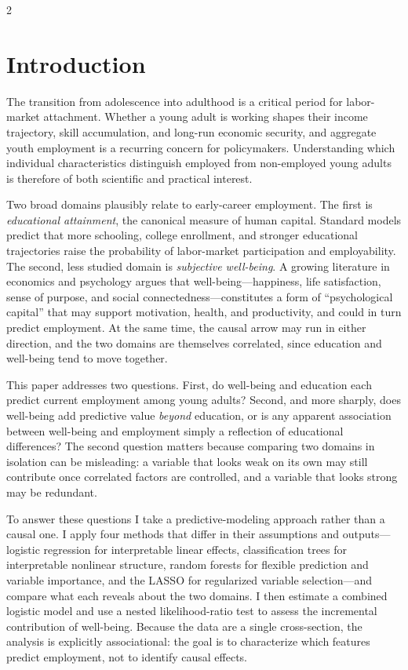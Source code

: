 \documentclass[
  11pt,
]{article}
\begin{document}
\begin{multicols}{2}

\section{Introduction}
The transition from adolescence into adulthood is a critical period for labor-market attachment. Whether a young adult is working shapes their income trajectory, skill accumulation, and long-run economic security, and aggregate youth employment is a recurring concern for policymakers. Understanding which individual characteristics distinguish employed from non-employed young adults is therefore of both scientific and practical interest.

Two broad domains plausibly relate to early-career employment. The first is \emph{educational attainment}, the canonical measure of human capital. Standard models predict that more schooling, college enrollment, and stronger educational trajectories raise the probability of labor-market participation and employability. The second, less studied domain is \emph{subjective well-being}. A growing literature in economics and psychology argues that well-being---happiness, life satisfaction, sense of purpose, and social connectedness---constitutes a form of ``psychological capital'' that may support motivation, health, and productivity, and could in turn predict employment. At the same time, the causal arrow may run in either direction, and the two domains are themselves correlated, since education and well-being tend to move together.

This paper addresses two questions. First, do well-being and education each predict current employment among young adults? Second, and more sharply, does well-being add predictive value \emph{beyond} education, or is any apparent association between well-being and employment simply a reflection of educational differences? The second question matters because comparing two domains in isolation can be misleading: a variable that looks weak on its own may still contribute once correlated factors are controlled, and a variable that looks strong may be redundant.

To answer these questions I take a predictive-modeling approach rather than a causal one. I apply four methods that differ in their assumptions and outputs---logistic regression for interpretable linear effects, classification trees for interpretable nonlinear structure, random forests for flexible prediction and variable importance, and the LASSO for regularized variable selection---and compare what each reveals about the two domains. I then estimate a combined logistic model and use a nested likelihood-ratio test to assess the incremental contribution of well-being. Because the data are a single cross-section, the analysis is explicitly associational: the goal is to characterize which features predict employment, not to identify causal effects.


\end{multicols}
\end{document}
